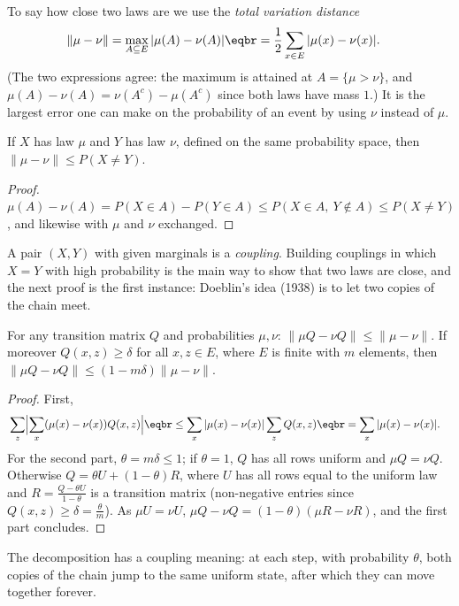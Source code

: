 To say how close two laws are we use the \emph{total variation distance}
\[
\begin{aligned}\|\mu-\nu\|&=\max_{A\subseteq E}|\mu(A)-\nu(A)|\eqbr=\frac12\sum_{x\in E}|\mu(x)-\nu(x)|.\end{aligned}
\]
(The two expressions agree: the maximum is attained at $A=\{\mu>\nu\}$, and $\mu(A)-\nu(A)=\nu(A^c)-\mu(A^c)$ since both laws have mass $1$.) It is the
largest error one can make on the probability of an event by using $\nu$ instead of $\mu$.

\begin{lemma}\label{lem:coupling}
If $X$ has law $\mu$ and $Y$ has law $\nu$, defined on the same probability space, then $\|\mu-\nu\|\le P(X\ne Y)$.
\end{lemma}
\begin{proof}
$\mu(A)-\nu(A)=P(X\in A)-P(Y\in A)\le P(X\in A,\ Y\notin A)\le P(X\ne Y)$, and likewise with $\mu$ and $\nu$ exchanged.
\end{proof}

A pair $(X,Y)$ with given marginals is a \emph{coupling}. Building couplings in which $X=Y$ with high probability is the main way to
show that two laws are close, and the next proof is the first instance: Doeblin's idea (1938) is to let two copies of
the chain meet.

\begin{lemma}\label{lem:contraction}
For any transition matrix $Q$ and probabilities $\mu,\nu$: $\|\mu Q-\nu Q\|\le\|\mu-\nu\|$. If moreover $Q(x,z)\ge\delta$ for all $x,z\in E$, where $E$ is
finite with $m$ elements, then $\|\mu Q-\nu Q\|\le(1-m\delta)\|\mu-\nu\|$.
\end{lemma}
\begin{proof}
First,
\[
\begin{aligned}{}&\sum_z\Bigl|\sum_x(\mu(x)-\nu(x))Q(x,z)\Bigr|\eqbr\le\sum_x|\mu(x)-\nu(x)|\sum_zQ(x,z)\eqbr=\sum_x|\mu(x)-\nu(x)|.\end{aligned}
\]
For the second part, $\theta=m\delta\le1$; if $\theta=1$, $Q$ has all
rows uniform and $\mu Q=\nu Q$. Otherwise $Q=\theta U+(1-\theta)R$, where $U$ has all rows equal to the uniform law and $R=\frac{Q-\theta U}{1-\theta}$ is a
transition matrix (non-negative entries since $Q(x,z)\ge\delta=\frac\theta m$). As $\mu U=\nu U$, $\mu Q-\nu Q=(1-\theta)(\mu R-\nu R)$, and the first part concludes.
\end{proof}

The decomposition has a coupling meaning: at each step, with probability $\theta$, both copies of the chain jump to the same
uniform state, after which they can move together forever.

